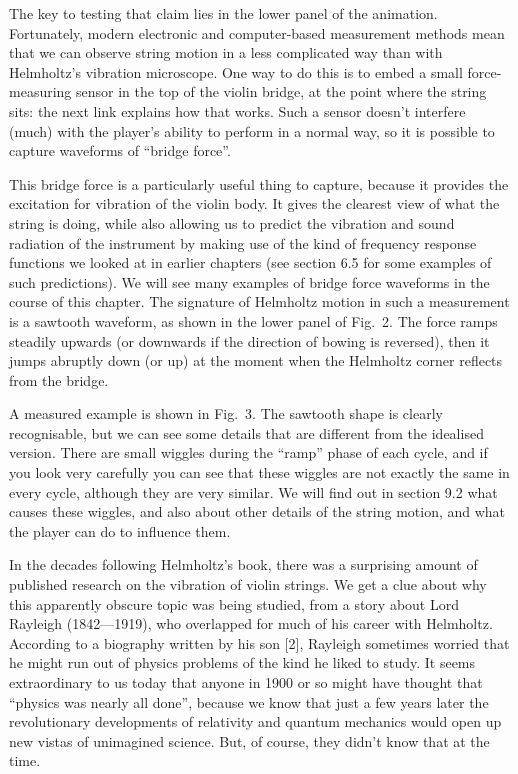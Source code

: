   The key to testing that claim lies in the lower panel of the animation. 
  Fortunately, modern electronic and computer-based measurement methods mean 
  that we can observe string motion in a less complicated way than with 
  Helmholtz’s vibration microscope. One way to do this is to embed a small 
  force-measuring sensor in the top of the violin bridge, at the point where 
  the string sits: the next link explains how that works. Such a sensor doesn’t 
  interfere (much) with the player’s ability to perform in a normal way, so it 
  is possible to capture waveforms of ``bridge force''. 

  This bridge force is a particularly useful thing to capture, because it 
  provides the excitation for vibration of the violin body. It gives the 
  clearest view of what the string is doing, while also allowing us to predict 
  the vibration and sound radiation of the instrument by making use of the kind 
  of frequency response functions we looked at in earlier chapters (see section 
  6.5 for some examples of such predictions). We will see many examples of 
  bridge force waveforms in the course of this chapter. The signature of 
  Helmholtz motion in such a measurement is a sawtooth waveform, as shown in 
  the lower panel of Fig.\ 2. The force ramps steadily upwards (or downwards if 
  the direction of bowing is reversed), then it jumps abruptly down (or up) at 
  the moment when the Helmholtz corner reflects from the bridge. 

  A measured example is shown in Fig.\ 3. The sawtooth shape is clearly 
  recognisable, but we can see some details that are different from the 
  idealised version. There are small wiggles during the ``ramp'' phase of each 
  cycle, and if you look very carefully you can see that these wiggles are not 
  exactly the same in every cycle, although they are very similar. We will find 
  out in section 9.2 what causes these wiggles, and also about other details of 
  the string motion, and what the player can do to influence them. 


  In the decades following Helmholtz’s book, there was a surprising amount of 
  published research on the vibration of violin strings. We get a clue about 
  why this apparently obscure topic was being studied, from a story about Lord 
  Rayleigh (1842—1919), who overlapped for much of his career with Helmholtz. 
  According to a biography written by his son [2], Rayleigh sometimes worried 
  that he might run out of physics problems of the kind he liked to study. It 
  seems extraordinary to us today that anyone in 1900 or so might have thought 
  that “physics was nearly all done”, because we know that just a few years 
  later the revolutionary developments of relativity and quantum mechanics 
  would open up new vistas of unimagined science. But, of course, they didn’t 
  know that at the time. 

